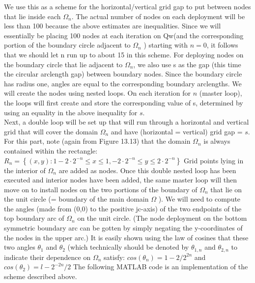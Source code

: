\documentclass[../main.tex]{subfiles}
\begin{document}
We use this as a scheme for the horizontal/vertical grid gap to put between nodes that lie inside each $\Omega_n$. The actual number of nodes on each deployment will be less than 100 because the above estimates are inequalities. Since we will essentially be placing 100 nodes at each iteration on Qw(and the corresponding portion of the boundary circle adjacent to $\Omega_n$ ) starting with $n = 0$, it follows that we should let n run up to about 15 in this scheme. For deploying nodes on the boundary circle that lie adjacent to $\Omega_n$, we also use s as the gap (this time the circular arclength gap) between boundary nodes. Since the boundary circle has radius one, angles are equal to the corresponding boundary arclengths. We will create the nodes using nested loops. On each iteration for $n$ (master loop), the loops will first create and store the corresponding value of s, determined by using an equality in the above inequality for $s$. 
\\

Next, a double loop will be set up that will run through a horizontal and vertical 
grid that will cover the domain $\Omega_n$ and have (horizontal = vertical) grid gap = $s$. 
For this part, note (again from Figure 13.13) that the domain $\Omega_n$ is always 
contained within the rectangle: $R_n = \left\{ (x,y): 1 - 2 \cdot 2^{-n} \leqslant x \leqslant 1, - 2 \cdot 2^{-n} \leqslant y \leqslant2 \cdot 2^{-n} \right\}$ 
Grid points lying in the interior of $\Omega_n$ are added as nodes. Once this 
double nested loop has been executed and interior nodes have been added, the 
same master loop will then move on to install nodes on the two portions of the 
boundary of $\Omega_n$ that lie on the unit circle (= boundary of the main domain $\Omega$ ). 
We will need to compute the angles (made from (0,0) to the positive jc-axis) of the 
two endpoints of the top boundary arc of $\Omega_n$ on the unit circle. (The node 
deployment on the bottom symmetric boundary arc can be gotten by simply 
negating the y-coordinates of the nodes in the upper arc.) It is easily shown using 
the law of cosines that these two angles $\theta_1$ and $\theta_2$ (which technically should be 
denoted by $\theta_{1,n}$ and $\theta_{2,n}$ to indicate their dependence on 
$ \Omega_n$ satisfy: $cos(\theta_n)= 1-2/2^{2n}$
and $cos(\theta_2) = l-2^{-2n}/2$
The following MATLAB code is an 
implementation of the scheme described above. 
\end{document}
